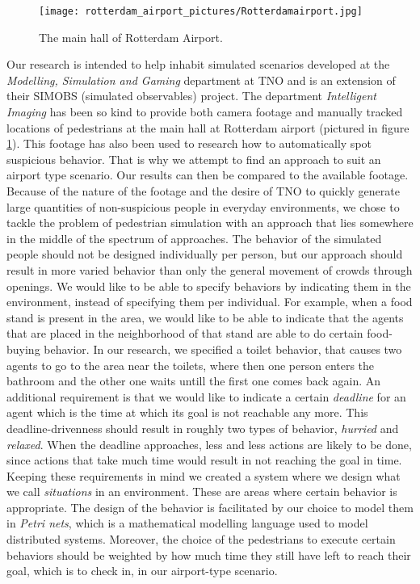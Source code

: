 \documentclass[11pt, a4paper]{book}
\begin{document}
\begin{figure}
\begin{center}
\texttt{[image: rotterdam\_airport\_pictures/Rotterdamairport.jpg]}

\end{center}
\caption{The main hall of Rotterdam Airport.}
\label{fig:airportimage}
\end{figure}

Our research is intended to help inhabit simulated scenarios developed at the \emph{Modelling, Simulation and Gaming} department at TNO and is an extension of their SIMOBS (simulated observables) project. The department \emph{Intelligent Imaging} has been so kind to provide both camera footage and manually tracked locations of pedestrians at the main hall at Rotterdam airport (pictured in figure \ref{fig:airportimage}). This footage has also been used to research how to automatically spot suspicious behavior. That is why we attempt to find an approach to suit an airport type scenario. Our results can then be compared to the available footage. Because of the nature of the footage and the desire of TNO to quickly generate large quantities of non-suspicious people in everyday environments, we chose to tackle the problem of pedestrian simulation with an approach that lies somewhere in the middle of the spectrum of approaches. The behavior of the simulated people should not be designed individually per person, but our approach should result in more varied behavior than only the general movement of crowds through openings. We would like to be able to specify behaviors by indicating them in the environment, instead of specifying them per individual. For example, when a food stand is present in the area, we would like to be able to indicate that the agents that are placed in the neighborhood of that stand are able to do certain food-buying behavior. In our research, we specified a toilet behavior, that causes two agents to go to the area near the toilets, where then one person enters the bathroom and the other one waits untill the first one comes back again.
An additional requirement is that we would like to indicate a certain \emph{deadline} for an agent which is the time at which its goal is not reachable any more. This deadline-drivenness should result in roughly two types of behavior, \emph{hurried} and \emph{relaxed}. When the deadline approaches, less and less actions are likely to be done, since actions that take much time would result in not reaching the goal in time.\\
Keeping these requirements in mind we created a system where we design what we call \emph{situations} in an environment. These are areas where certain behavior is appropriate. The design of the behavior is facilitated by our choice to model them in \emph{Petri nets}, which is a mathematical modelling language used to model distributed systems. Moreover, the choice of the pedestrians to execute certain behaviors should be weighted by how much time they still have left to reach their goal, which is to check in, in our airport-type scenario.
\end{document}
